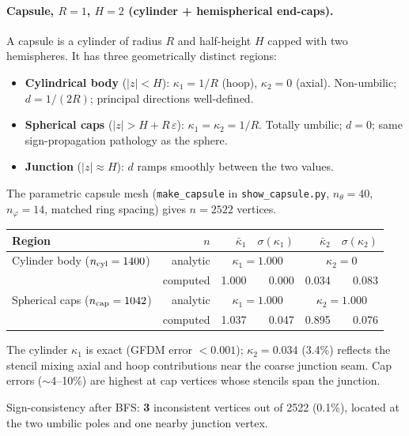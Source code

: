 \documentclass[11pt]{article}
\newcommand{\kone}{\kappa_1}
\newcommand{\ktwo}{\kappa_2}
\begin{document}
\paragraph{Capsule, $R=1$, $H=2$ (cylinder + hemispherical end-caps).}

A capsule is a cylinder of radius $R$ and half-height $H$ capped with two
hemispheres.  It has three geometrically distinct regions:
\begin{itemize}[nosep]
  \item \textbf{Cylindrical body} ($|z|<H$): $\kone=1/R$ (hoop), $\ktwo=0$ (axial).
        Non-umbilic; $d=1/(2R)$; principal directions well-defined.
  \item \textbf{Spherical caps} ($|z|>H+R\,\varepsilon$): $\kone=\ktwo=1/R$.
        Totally umbilic; $d=0$; same sign-propagation pathology as the sphere.
  \item \textbf{Junction} ($|z|\approx H$): $d$ ramps smoothly between the two values.
\end{itemize}
The parametric capsule mesh (\texttt{make\_capsule} in \texttt{show\_capsule.py},
$n_\theta=40$, $n_\varphi=14$, matched ring spacing) gives $n=2522$ vertices.

\begin{center}
\begin{tabular}{lrrrrr}
\toprule
Region & $n$ & $\bar\kone$ & $\sigma(\kone)$ & $\bar\ktwo$ & $\sigma(\ktwo)$ \\
\midrule
Cylinder body ($n_{\rm cyl}=1400$) & analytic & \multicolumn{2}{c}{$\kone=1.000$} & \multicolumn{2}{c}{$\ktwo=0$} \\
 & computed & 1.000 & 0.000 & 0.034 & 0.083 \\[2pt]
Spherical caps ($n_{\rm cap}=1042$) & analytic & \multicolumn{2}{c}{$\kone=1.000$} & \multicolumn{2}{c}{$\ktwo=1.000$} \\
 & computed & 1.037 & 0.047 & 0.895 & 0.076 \\
\bottomrule
\end{tabular}
\end{center}

The cylinder $\kone$ is exact (GFDM error $<0.001$); $\ktwo=0.034$ (3.4\%)
reflects the stencil mixing axial and hoop contributions near the coarse
junction seam.  Cap errors ($\sim$4--10\%) are highest at cap vertices whose
stencils span the junction.

Sign-consistency after BFS: \textbf{3} inconsistent vertices out of 2522
(0.1\%), located at the two umbilic poles and one nearby junction vertex.
\end{document}
